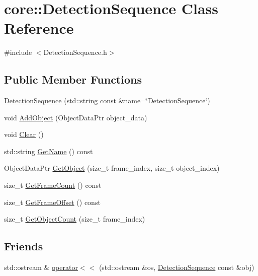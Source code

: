 \hypertarget{classcore_1_1DetectionSequence}{}\section{core\+:\+:Detection\+Sequence Class Reference}
\label{classcore_1_1DetectionSequence}


{\ttfamily \#include $<$Detection\+Sequence.\+h$>$}

\subsection*{Public Member Functions}
\begin{DoxyCompactItemize}
\item 
\hyperlink{classcore_1_1DetectionSequence_aed2967a51334c7b3e9053f2ab0f9990e}{Detection\+Sequence} (std\+::string const \&name=\char`\"{}Detection\+Sequence\char`\"{})
\item 
void \hyperlink{classcore_1_1DetectionSequence_a3cc0fdf3281f34985f4762086293db72}{Add\+Object} (Object\+Data\+Ptr object\+\_\+data)
\item 
void \hyperlink{classcore_1_1DetectionSequence_ab62569a3e51d58457057deba12ef6892}{Clear} ()
\item 
std\+::string \hyperlink{classcore_1_1DetectionSequence_a8a1af3dee89766d06f4a4f74044082ad}{Get\+Name} () const
\item 
Object\+Data\+Ptr \hyperlink{classcore_1_1DetectionSequence_a1faac919948e8b10d9112916f3a19bd0}{Get\+Object} (size\+\_\+t frame\+\_\+index, size\+\_\+t object\+\_\+index)
\item 
size\+\_\+t \hyperlink{classcore_1_1DetectionSequence_a2417e4f2652a39245d6f2faa0ce19571}{Get\+Frame\+Count} () const
\item 
size\+\_\+t \hyperlink{classcore_1_1DetectionSequence_a2c469219ac4f55aa9deacb5f63195de1}{Get\+Frame\+Offset} () const
\item 
size\+\_\+t \hyperlink{classcore_1_1DetectionSequence_ad6c77b1224bf5b149b78b60cc62d5564}{Get\+Object\+Count} (size\+\_\+t frame\+\_\+index)
\end{DoxyCompactItemize}
\subsection*{Friends}
\begin{DoxyCompactItemize}
\item 
std\+::ostream \& \hyperlink{classcore_1_1DetectionSequence_abc61c6378276573bcb84464d9f0b9e24}{operator$<$$<$} (std\+::ostream \&os, \hyperlink{classcore_1_1DetectionSequence}{Detection\+Sequence} const \&obj)
\end{DoxyCompactItemize}


